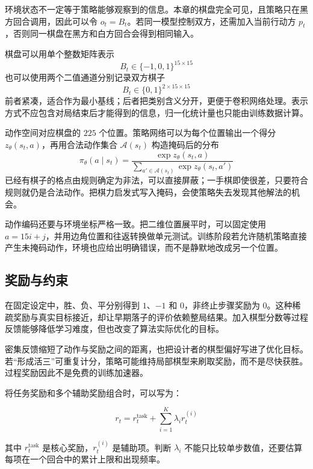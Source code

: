 环境状态不一定等于策略能够观察到的信息。本章的棋盘完全可见，且策略只在黑方回合调用，因此可以令 $o_t=B_t$。若同一模型控制双方，还需加入当前行动方 $p_t$，否则同一棋盘在黑方和白方回合会得到相同输入。

棋盘可以用单个整数矩阵表示
\begin{equation}
B_t\in\{-1,0,1\}^{15\times15}
\end{equation}
也可以使用两个二值通道分别记录双方棋子
\begin{equation}
B_t\in\{0,1\}^{2\times15\times15}
\end{equation}
前者紧凑，适合作为最小基线；后者把类别含义分开，更便于卷积网络处理。表示方式不应包含对局结束后才能得到的信息，归一化统计量也只能由训练数据计算。

动作空间对应棋盘的 $225$ 个位置。策略网络可以为每个位置输出一个得分 $z_\theta(s_t,a)$，再用合法动作集合 $\mathcal A(s_t)$ 构造掩码后的分布
\begin{equation}
\pi_\theta(a\mid s_t)
=
\frac{\exp z_\theta(s_t,a)}
{\sum_{a'\in\mathcal A(s_t)}\exp z_\theta(s_t,a')}
\end{equation}
已经有棋子的格点由规则确定为非法，可以直接屏蔽；一手棋即使很差，只要符合规则就仍是合法动作。把棋力启发式写入掩码，会使策略失去发现其他解法的机会。

动作编码还要与环境坐标严格一致。把二维位置展平时，可以固定使用 $a=15i+j$，并用边角位置和往返转换做单元测试。训练阶段若允许随机策略直接产生未掩码动作，环境也应给出明确错误，而不是静默地改成另一个位置。

\subsection{奖励与约束}

在固定设定中，胜、负、平分别得到 $1$、$-1$ 和 $0$，非终止步骤奖励为 $0$。这种稀疏奖励与真实目标接近，却让早期落子的评价依赖整局结果。加入棋型分数等过程反馈能够降低学习难度，但也改变了算法实际优化的目标。


密集反馈缩短了动作与奖励之间的距离，也把设计者的棋型偏好写进了优化目标。若“形成活三”可重复计分，策略可能维持局部棋型来刷取奖励，而不是尽快获胜。过程奖励因此不是免费的训练加速器。

将任务奖励和多个辅助奖励组合时，可以写为：

\begin{equation}
r_t
=
r_t^{\mathrm{task}}
+
\sum_{i=1}^{K}
\lambda_i r_t^{(i)}
\end{equation}

其中 $r_t^{\mathrm{task}}$ 是核心奖励，$r_t^{(i)}$ 是辅助项。判断 $\lambda_i$ 不能只比较单步数值，还要估算每项在一个回合中的累计上限和出现频率。

